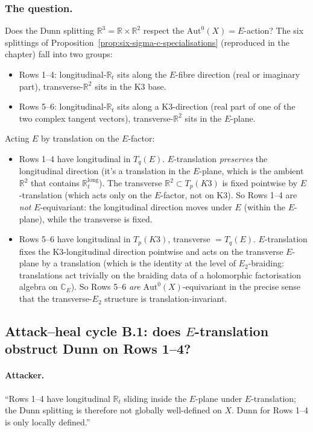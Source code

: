 \documentclass[11pt]{article}
\newcommand{\Etwo}{E_{2}}
\newcommand{\R}{\mathbb{R}}
\newcommand{\C}{\mathbb{C}}
\newcommand{\Aut}{\mathrm{Aut}}
\begin{document}
\subsubsection*{The question.}
Does the Dunn splitting $\R^3 = \R \times \R^2$ respect the
$\Aut^0(X) = E$-action? The six splittings of
Proposition~\ref{prop:six-sigma-c-specialisations} (reproduced in the
chapter) fall into two groups:
\begin{itemize}
\item Rows 1--4: longitudinal-$\R_t$ sits along the $E$-fibre direction
  (real or imaginary part), transverse-$\R^2$ sits in the K3 base.
\item Rows 5--6: longitudinal-$\R_t$ sits along a K3-direction
  (real part of one of the two complex tangent vectors), transverse-$\R^2$
  sits in the $E$-plane.
\end{itemize}

Acting $E$ by translation on the $E$-factor:
\begin{itemize}
\item Rows 1--4 have longitudinal in $T_q(E)$. $E$-translation
  \emph{preserves} the longitudinal direction (it's a translation in
  the $E$-plane, which is the ambient $\R^2$ that contains
  $\R_t^{\mathrm{long}}$). The transverse $\R^2 \subset T_p(K3)$ is
  fixed pointwise by $E$-translation (which acts only on the $E$-factor,
  not on K3). So Rows 1--4 are \emph{not} $E$-equivariant: the
  longitudinal direction moves under $E$ (within the $E$-plane), while
  the transverse is fixed.
\item Rows 5--6 have longitudinal in $T_p(K3)$, transverse $= T_q(E)$.
  $E$-translation fixes the K3-longitudinal direction pointwise and
  acts on the transverse $E$-plane by a translation (which is the
  identity at the level of $\Etwo$-braiding: translations act trivially
  on the braiding data of a holomorphic factorisation algebra on
  $\C_E$). So Rows 5--6 \emph{are} $\Aut^0(X)$-equivariant in the
  precise sense that the transverse-$\Etwo$ structure is translation-invariant.
\end{itemize}

\subsection{Attack--heal cycle B.1: does $E$-translation obstruct
  Dunn on Rows 1--4?}

\paragraph{Attacker.}
``Rows 1--4 have longitudinal $\R_t$ sliding inside the $E$-plane under
$E$-translation; the Dunn splitting is therefore not globally
well-defined on $X$. Dunn for Rows 1--4 is only locally defined.''
\end{document}
